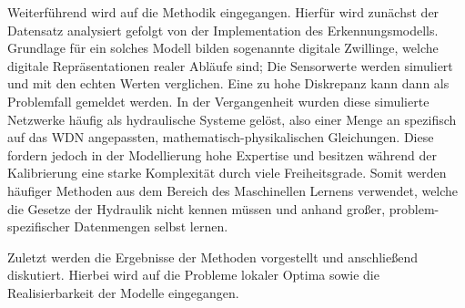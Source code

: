 Weiterführend wird auf die Methodik eingegangen. Hierfür wird zunächst der Datensatz analysiert gefolgt von
 der Implementation des Erkennungsmodells. Grundlage für ein solches Modell bilden sogenannte digitale Zwillinge,
 welche digitale Repräsentationen realer Abläufe sind; Die Sensorwerte werden simuliert und mit den echten
 Werten verglichen. Eine zu hohe Diskrepanz kann dann als Problemfall gemeldet werden. In der Vergangenheit
 wurden diese simulierte Netzwerke häufig als hydraulische Systeme gelöst, also einer Menge an spezifisch auf
 das WDN angepassten, mathematisch-physikalischen Gleichungen. Diese fordern jedoch in der Modellierung hohe
 Expertise und besitzen während der Kalibrierung eine starke Komplexität durch viele Freiheitsgrade. Somit
 werden häufiger Methoden aus dem Bereich des Maschinellen Lernens verwendet, welche die Gesetze der Hydraulik
 nicht kennen müssen und anhand großer, problem-spezifischer Datenmengen selbst lernen.

Zuletzt werden die Ergebnisse der Methoden vorgestellt und anschließend diskutiert. Hierbei wird auf die
 Probleme lokaler Optima sowie die Realisierbarkeit der Modelle eingegangen.
